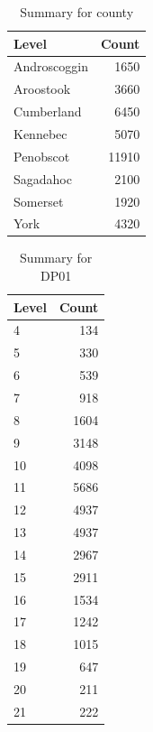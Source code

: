 \begin{table}[ht]
\centering
\begin{tabular}{lr}
  \hline
Level & Count \\ 
  \hline
Androscoggin & 1650 \\ 
  Aroostook & 3660 \\ 
  Cumberland & 6450 \\ 
  Kennebec & 5070 \\ 
  Penobscot & 11910 \\ 
  Sagadahoc & 2100 \\ 
  Somerset & 1920 \\ 
  York & 4320 \\ 
   \hline
\end{tabular}
\caption{Summary for county} 
\label{tab: county}
\end{table}
\begin{table}[ht]
\centering
\begin{tabular}{lr}
  \hline
Level & Count \\ 
  \hline
4 & 134 \\ 
  5 & 330 \\ 
  6 & 539 \\ 
  7 & 918 \\ 
  8 & 1604 \\ 
  9 & 3148 \\ 
  10 & 4098 \\ 
  11 & 5686 \\ 
  12 & 4937 \\ 
  13 & 4937 \\ 
  14 & 2967 \\ 
  15 & 2911 \\ 
  16 & 1534 \\ 
  17 & 1242 \\ 
  18 & 1015 \\ 
  19 & 647 \\ 
  20 & 211 \\ 
  21 & 222 \\ 
   \hline
\end{tabular}
\caption{Summary for DP01} 
\label{tab: DP01}
\end{table}
